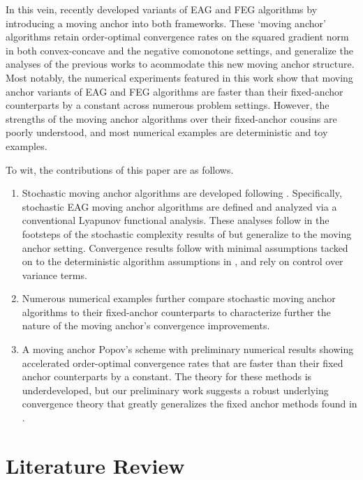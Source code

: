 \documentclass[11pt,reqno,oneside]{amsart}
\theoremstyle{definition}
\numberwithin{equation}{section}
\begin{document}
In this vein, \cite{alcala2023moving} recently developed variants of EAG \cite{yoon_ryu} and FEG \cite{lee2021fast} algorithms by introducing a moving anchor into both frameworks.
These `moving anchor' algorithms retain order-optimal convergence rates on the squared gradient norm in both convex-concave and the negative comonotone settings, and generalize the analyses of the previous works to acommodate this new moving anchor structure.
Most notably, the numerical experiments featured in this work show that moving anchor variants of EAG and FEG algorithms are faster than their fixed-anchor counterparts by a constant across numerous problem settings.
However, the strengths of the moving anchor algorithms over their fixed-anchor cousins are poorly understood, and most numerical examples are deterministic and toy examples.

To wit, the contributions of this paper are as follows.
\begin{enumerate}
    \item Stochastic moving anchor algorithms are developed following \cite{alcala2023moving}. Specifically, stochastic EAG moving anchor algorithms are defined and analyzed via a conventional Lyapunov functional analysis. These analyses follow in the footsteps of the stochastic complexity results of \cite{lee2021fast} but generalize to the moving anchor setting. Convergence results follow with minimal assumptions tacked on to the deterministic algorithm assumptions in \cite{alcala2023moving}, and rely on control over variance terms. 
    \item Numerous numerical examples further compare stochastic moving anchor algorithms to their fixed-anchor counterparts to characterize further the nature of the moving anchor's convergence improvements.
    \item A moving anchor Popov's scheme with preliminary numerical results showing accelerated order-optimal convergence rates that are faster than their fixed anchor counterparts by a constant. The theory for these methods is underdeveloped, but our preliminary work suggests a robust underlying convergence theory that greatly generalizes the fixed anchor methods found in \cite{tran2021halpern}.
\end{enumerate}

\section{Literature Review}
\end{document}
